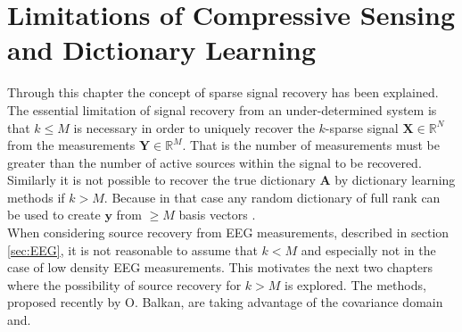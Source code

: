 \section{Limitations of Compressive Sensing and Dictionary Learning}
Through this chapter the concept of sparse signal recovery has been explained. 
The essential limitation of signal recovery from an under-determined system is that $k\leq M$ is necessary in order to uniquely recover the $k$-sparse signal $\textbf{X}\in \mathbb{R}^N$ from the measurements $\textbf{Y} \in \mathbb{R}^M$. 
That is the number of measurements must be greater than the number of active sources within the signal to be recovered.  
Similarly it is not possible to recover the true dictionary $\textbf{A}$ by dictionary learning methods if $k>M$. 
Because in that case any random dictionary of full rank can be used to create $\textbf{y}$ from $\geq M$ basis vectors \cite[p. 30]{phd2015}. 
\\
When considering source recovery from EEG measurements, described in section \ref{sec:EEG}, it is not reasonable to assume that $k<M$ and especially not in the case of low density EEG measurements. 
This motivates the next two chapters where the possibility of source recovery for $k>M$ is explored. 
The methods, proposed recently by O. Balkan, are taking advantage of the covariance domain and.



